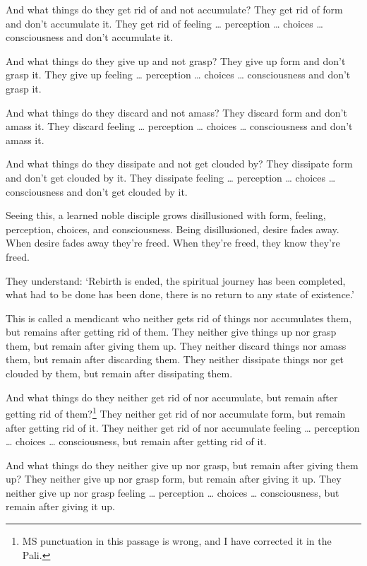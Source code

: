\documentclass[12pt,openany]{book}%
\begin{document}
And what things do they get rid of and not accumulate? They get rid of form and don’t accumulate it. They get rid of feeling … perception … choices … consciousness and don’t accumulate it. 

And what things do they give up and not grasp? They give up form and don’t grasp it. They give up feeling … perception … choices … consciousness and don’t grasp it. 

And what things do they discard and not amass? They discard form and don’t amass it. They discard feeling … perception … choices … consciousness and don’t amass it. 

And what things do they dissipate and not get clouded by? They dissipate form and don’t get clouded by it. They dissipate feeling … perception … choices … consciousness and don’t get clouded by it. 

Seeing this, a learned noble disciple grows disillusioned with form, feeling, perception, choices, and consciousness. Being disillusioned, desire fades away. When desire fades away they’re freed. When they’re freed, they know they’re freed. 

They understand: ‘Rebirth is ended, the spiritual journey has been completed, what had to be done has been done, there is no return to any state of existence.’ 

This is called a mendicant who neither gets rid of things nor accumulates them, but remains after getting rid of them. They neither give things up nor grasp them, but remain after giving them up. They neither discard things nor amass them, but remain after discarding them. They neither dissipate things nor get clouded by them, but remain after dissipating them. 

And what things do they neither get rid of nor accumulate, but remain after getting rid of them?\footnote{MS punctuation in this passage is wrong, and I have corrected it in the Pali. } They neither get rid of nor accumulate form, but remain after getting rid of it. They neither get rid of nor accumulate feeling … perception … choices … consciousness, but remain after getting rid of it. 

And what things do they neither give up nor grasp, but remain after giving them up? They neither give up nor grasp form, but remain after giving it up. They neither give up nor grasp feeling … perception … choices … consciousness, but remain after giving it up. 
\end{document}

